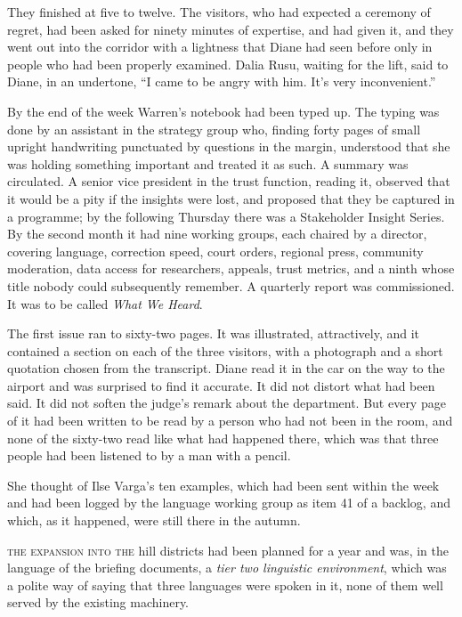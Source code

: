 They finished at five to twelve. The visitors, who had expected a ceremony of regret, had been asked for ninety minutes of expertise, and had given it, and they went out into the corridor with a lightness that Diane had seen before only in people who had been properly examined. Dalia Rusu, waiting for the lift, said to Diane, in an undertone, ``I came to be angry with him. It's very inconvenient.''

By the end of the week Warren's notebook had been typed up. The typing was done by an assistant in the strategy group who, finding forty pages of small upright handwriting punctuated by questions in the margin, understood that she was holding something important and treated it as such. A summary was circulated. A senior vice president in the trust function, reading it, observed that it would be a pity if the insights were lost, and proposed that they be captured in a programme; by the following Thursday there was a Stakeholder Insight Series. By the second month it had nine working groups, each chaired by a director, covering language, correction speed, court orders, regional press, community moderation, data access for researchers, appeals, trust metrics, and a ninth whose title nobody could subsequently remember. A quarterly report was commissioned. It was to be called \emph{What We Heard}.

The first issue ran to sixty-two pages. It was illustrated, attractively, and it contained a section on each of the three visitors, with a photograph and a short quotation chosen from the transcript. Diane read it in the car on the way to the airport and was surprised to find it accurate. It did not distort what had been said. It did not soften the judge's remark about the department. But every page of it had been written to be read by a person who had not been in the room, and none of the sixty-two read like what had happened there, which was that three people had been listened to by a man with a pencil.

She thought of Ilse Varga's ten examples, which had been sent within the week and had been logged by the language working group as item 41 of a backlog, and which, as it happened, were still there in the autumn.


\textsc{the expansion into the} hill districts had been planned for a year and was, in the language of the briefing documents, a \emph{tier two linguistic environment}, which was a polite way of saying that three languages were spoken in it, none of them well served by the existing machinery.

